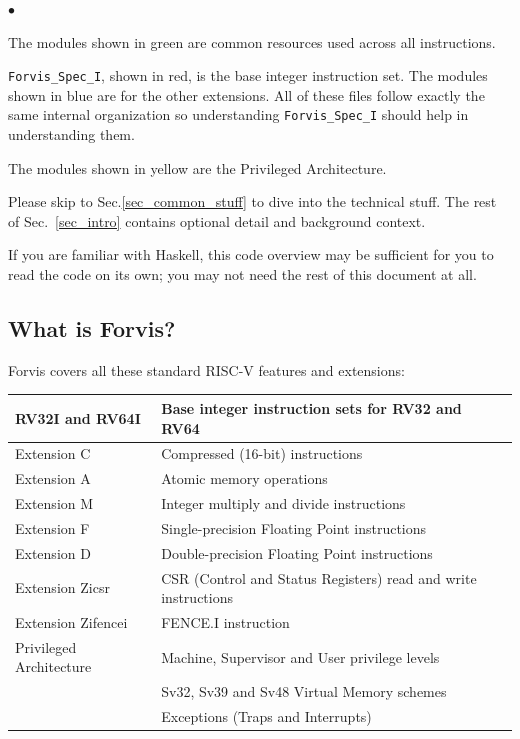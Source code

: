 \documentclass[11pt]{article}
\newenvironment{tightlist}%
{\begin{list}{$\bullet$}{%
    \setlength{\topsep}{0in}
    \setlength{\partopsep}{0in}
    \setlength{\itemsep}{0in}
    \setlength{\parsep}{0in}
    \setlength{\leftmargin}{1.5em}
    \setlength{\rightmargin}{0in}
    \setlength{\itemindent}{0in}
}
}%
{\end{list}
}
\begin{document}
\begin{tightlist}

\item The modules shown in green are common resources used across all instructions.

\item \verb|Forvis_Spec_I|, shown in red, is the base integer
instruction set.  The modules shown in blue are for the other
extensions. All of these files follow exactly the same internal
organization so understanding \verb|Forvis_Spec_I| should help in
understanding them.

\item The modules shown in yellow are the Privileged Architecture.

\end{tightlist}

Please skip to Sec.\ref{sec_common_stuff} to dive into the technical
stuff.  The rest of Sec.~\ref{sec_intro} contains optional detail and
background context.

If you are familiar with Haskell, this code overview may be sufficient
for you to read the code on its own; you may not need the rest of this
document at all.


\subsection{What is Forvis?}

Forvis covers all these standard RISC-V features and extensions:

\begin{center}
\begin{tabular}{|l|l|}
\hline
RV32I and RV64I  & Base integer instruction sets for RV32 and RV64 \\
\hline
Extension C      & Compressed (16-bit) instructions \\
\hline
Extension A      & Atomic memory operations \\
\hline
Extension M      & Integer multiply and divide instructions \\
\hline
Extension F      & Single-precision Floating Point instructions \\
\hline
Extension D      & Double-precision Floating Point instructions \\
\hline
Extension Zicsr  & CSR (Control and Status Registers) read and write instructions\\
\hline
Extension Zifencei  & FENCE.I instruction \\
\hline
Privileged Architecture  & Machine, Supervisor and User privilege levels \\
                         & Sv32, Sv39 and Sv48 Virtual Memory schemes \\
			 & Exceptions (Traps and Interrupts) \\
\hline
\end{tabular}
\end{center}
\end{document}
